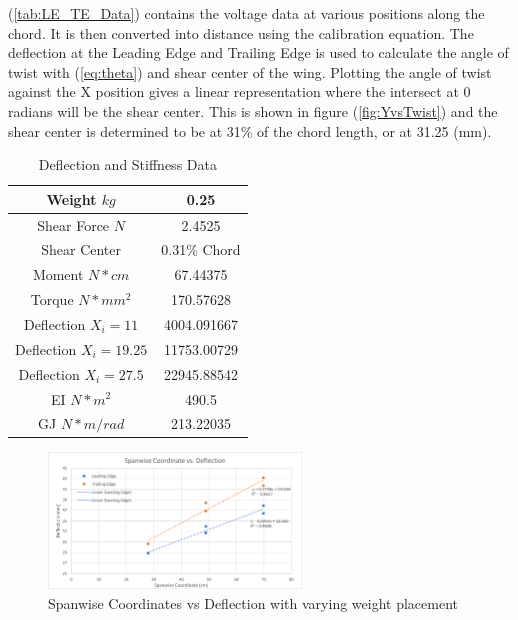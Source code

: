 \documentclass{article}
\begin{document}
(\ref{tab:LE_TE_Data}) contains the voltage data at various positions along the chord.  It is then converted into distance using the calibration equation.  The deflection at the Leading Edge and Trailing Edge is used to calculate the angle of twist with (\ref{eq:theta}) %
and shear center of the wing.  Plotting the angle of twist against the X position gives a linear representation where the intersect at 0 radians will be the shear center.  This is shown in figure (\ref{fig:YvsTwist}) %
and the shear center is determined to be at 31\% of the chord length, or at 31.25 (mm).

\begin{table}[hbtp]
  \centering
  \begin{tabular}{|c|c|}
  \hline
  Weight \(kg\) & 0.25 \\
  \hline
  Shear Force \(N\) & 2.4525 \\
  \hline
  Shear Center & 0.31\% Chord \\
  \hline
  Moment \(N*cm\) & 67.44375 \\
  \hline
  Torque \(N*mm^2\) & 170.57628 \\
  \hline
  Deflection \(X_i=11\) & 4004.091667 \\
  \hline
  Deflection \(X_i=19.25\) & 11753.00729 \\
  \hline
  Deflection \(X_i=27.5\) & 22945.88542 \\
  \hline
  EI \(N*m^2\) & 490.5 \\
  \hline
  GJ \(N*m/rad\) & 213.22035 \\
  \hline
  \end{tabular}
  \caption{Deflection and Stiffness Data}
  \label{tab:deflect_stiff}
\end{table}

\begin{figure}[hbtp]
  \centering
  \includegraphics[width=0.6\textwidth]{lab3images/SpanwiseDeflection.png}
  \caption{Spanwise Coordinates vs Deflection with varying weight placement}
  \label{fig:SpanwiseDeflection}
\end{figure}
\end{document}
